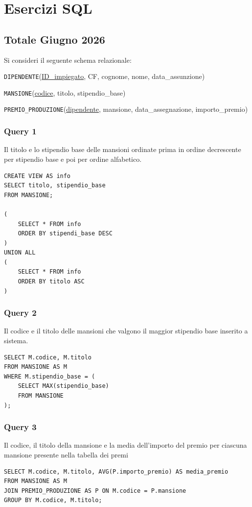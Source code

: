 \chapter{Esercizi SQL}
\section{Totale Giugno 2026}
Si consideri il seguente schema relazionale:


\texttt{DIPENDENTE}(\underline{ID\_impiegato}, CF, cognome, nome, data\_assunzione)


\texttt{MANSIONE}(\underline{codice}, titolo, stipendio\_base)


\texttt{PREMIO\_PRODUZIONE}(\underline{dipendente}, mansione, data\_assegnazione, importo\_premio)

\subsection{Query 1}
Il titolo e lo stipendio base delle mansioni ordinate prima in ordine decrescente per stipendio base e poi per ordine alfabetico.

\begin{lstlisting}
CREATE VIEW AS info
SELECT titolo, stipendio_base
FROM MANSIONE;

(
    SELECT * FROM info
    ORDER BY stipendi_base DESC
)
UNION ALL
(
    SELECT * FROM info
    ORDER BY titolo ASC
)
\end{lstlisting}

\subsection{Query 2}
Il codice e il titolo delle mansioni che valgono il maggior stipendio base inserito a sistema.

\begin{lstlisting}
SELECT M.codice, M.titolo
FROM MANSIONE AS M
WHERE M.stipendio_base = (
    SELECT MAX(stipendio_base)
    FROM MANSIONE
);
\end{lstlisting}

\subsection{Query 3}
Il codice, il titolo della mansione e la media dell'importo del premio per ciascuna mansione presente nella tabella dei premi

\begin{lstlisting}
SELECT M.codice, M.titolo, AVG(P.importo_premio) AS media_premio
FROM MANSIONE AS M 
JOIN PREMIO_PRODUZIONE AS P ON M.codice = P.mansione
GROUP BY M.codice, M.titolo;
\end{lstlisting}

